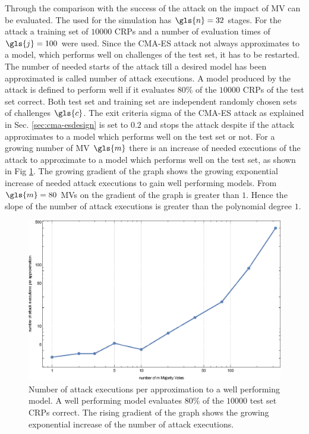 Through the comparison with the success of the attack on \apuf the impact of \ac{MV} can be evaluated.
The \apuf used for the simulation has $\gls{n} = 32$ stages.
For the attack a training set of $10000$ \acp{CRP} and a number of evaluation times of $\gls{j} = 100$ were used.
Since the \ac{CMA-ES} attack not always approximates to a model, which performs well on challenges of the test set, it has to be restarted.
The number of needed starts of the attack till a desired model has been approximated is called number of attack executions.
A model produced by the attack is defined to perform well if it evaluates $80 \%$ of the $10000$ \acp{CRP} of the test set correct.
Both test set and training set are independent randomly chosen sets of challenges $\gls{c}$.
The exit criteria sigma of the \ac{CMA-ES} attack as explained in Sec. \ref{sec:cma-esdesign} is set to $0.2$ and stops the attack despite if the attack approximates to a model which performs well on the test set or not.
For a growing number of \ac{MV} $\gls{m}$ there is an increase of needed executions of the attack to approximate to a model which performs well on the test set, as shown in Fig \ref{fig:cmasingleattackcorrelation}.
The growing gradient of the graph shows the growing exponential increase of needed attack executions to gain well performing models.
From $\gls{m} = 80$ \acp{MV} on the gradient of the graph is greater than $1$.
Hence the slope of the number of attack executions is greater than the polynomial degree $1$.

\begin{figure}[ht]
\includegraphics[width=1.00\textwidth]{images/single-mv-classification-cma-attack-correlation.eps}
\caption[Needed \acs{CMA-ES} attack executions for \mpufs]{Number of attack executions per approximation to a well performing model. A well performing model evaluates $80 \%$ of the $10000$ test set \acp{CRP} correct. The rising gradient of the graph shows the growing exponential increase of the number of attack executions.}
\label{fig:cmasingleattackcorrelation}
\end{figure}

